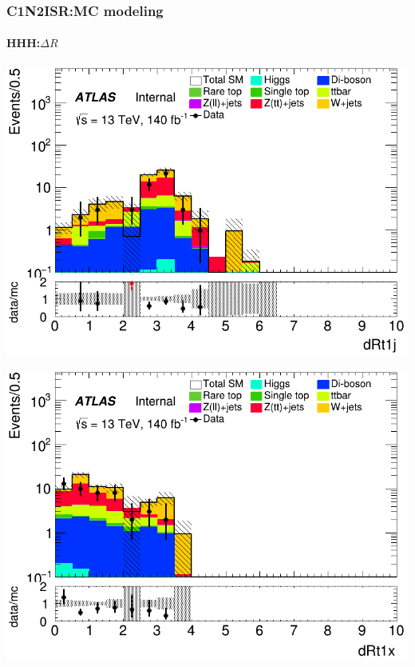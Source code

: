 \documentclass[usenames,dvipsnames]{beamer}
\begin{document}
\begin{frame}
\frametitle{C1N2ISR:MC modeling}
\framesubtitle{HHH:\quad $\Delta R$}
    \begin{minipage}{0.32\textwidth}
        \centering
        \includegraphics[width=\textwidth]{graphics/HHH_met/HHH_met_dRt1j.png}
    \end{minipage}
    \hfill
    \begin{minipage}{0.32\textwidth}
        \centering
        \includegraphics[width=\textwidth]{graphics/HHH_met/HHH_met_dRt1x.png}
    \end{minipage}
    \hfill
    \begin{minipage}{0.32\textwidth}
        \centering

\end{minipage}
\end{frame}
\end{document}
